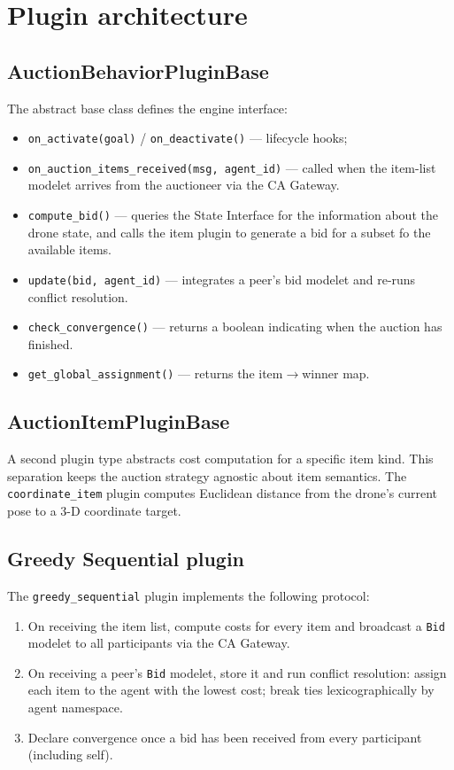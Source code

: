\documentclass[deliverable]{csreport}
\renewcommand{\code}[1]{\texttt{\textcolor{CSMaroon}{#1}}}%
\begin{document}
\section{Plugin architecture}

\subsection{AuctionBehaviorPluginBase}

The abstract base class defines the engine interface:
\begin{itemize}
  \item \code{on\_activate(goal)} / \code{on\_deactivate()} --- lifecycle hooks;
  \item \code{on\_auction\_items\_received(msg, agent\_id)} --- called when the item-list modelet arrives from the auctioneer via the CA Gateway.
  \item \code{compute\_bid()} --- queries the State Interface for the information about the drone state, and calls the item plugin to generate a bid for a subset fo the available items.
  \item \code{update(bid, agent\_id)} --- integrates a peer's bid modelet and re-runs conflict resolution.
  \item \code{check\_convergence()} --- returns a boolean indicating when the auction has finished.
  \item \code{get\_global\_assignment()} --- returns the item$\to$winner map.
\end{itemize}

\subsection{AuctionItemPluginBase}

A second plugin type abstracts cost computation for a specific item kind. This separation keeps the auction strategy agnostic about item semantics. The \code{coordinate\_item} plugin computes Euclidean distance from the drone's current pose to a 3-D coordinate target.

\subsection{Greedy Sequential plugin}

The \code{greedy\_sequential} plugin implements the following protocol:

\begin{enumerate}
  \item On receiving the item list, compute costs for every item and broadcast a \code{Bid} modelet to all participants via the CA Gateway.
  \item On receiving a peer's \code{Bid} modelet, store it and run conflict resolution: assign each item to the agent with the lowest cost; break ties lexicographically by agent namespace.
  \item Declare convergence once a bid has been received from every participant (including self).
\end{enumerate}
\end{document}
